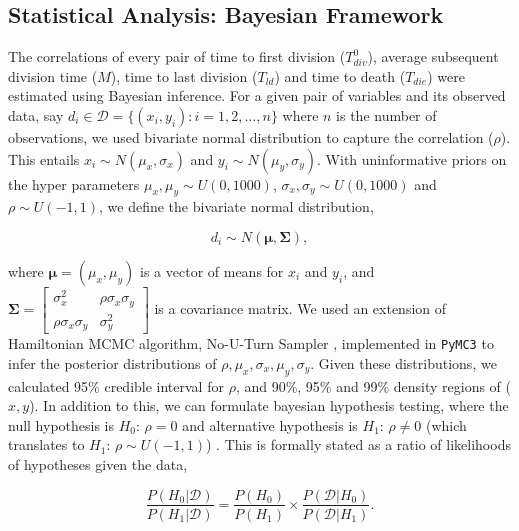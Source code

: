 \documentclass[11pt, a4paper]{article}
\begin{document}
\subsection{Statistical Analysis: Bayesian Framework}
The correlations of every pair of time to first division ($T_{div}^0$), average subsequent division time ($M$), time to last division ($T_{ld}$) and time to death ($T_{die}$) were estimated using Bayesian inference. For a given pair of variables and its observed data, say $d_i \in \mathcal{D} = \{(x_i, y_i) : i=1,2,\dots,n\}$ where $n$ is the number of observations, we used bivariate normal distribution to capture the correlation ($\rho$). This entails $x_i \sim N(\mu_x, \sigma_x)$ and $y_i \sim N(\mu_y, \sigma_y)$. With uninformative priors on the hyper parameters $\mu_x, \mu_y \sim U(0, 1000)$, $\sigma_x, \sigma_y \sim U(0, 1000)$ and $\rho \sim U(-1, 1)$, we define the bivariate normal distribution,
\begin{linenomath*}
    \begin{equation*}
        d_i \sim N(\boldsymbol{\mu}, \mathbf{\Sigma}),
    \end{equation*}
\end{linenomath*}
where $\boldsymbol{\mu} = (\mu_x, \mu_y)$ is a vector of means for $x_i$ and $y_i$, and $\mathbf{\Sigma} = \begin{bmatrix*} \sigma_x^2 & \rho \sigma_x \sigma_y \\ \rho \sigma_x \sigma_y & \sigma_y^2 \end{bmatrix*}$ is a covariance matrix. We used an extension of Hamiltonian MCMC algorithm, No-U-Turn Sampler \parencite{Hoffman.2011}, implemented in \verb+PyMC3+ \parencite{Salvatier.2016} to infer the posterior distributions of $\rho, \mu_x, \sigma_x, \mu_y, \sigma_y$. Given these distributions, we calculated 95\% credible interval for $\rho$, and 90\%, 95\% and 99\% density regions of ($x, y$). In addition to this, we can formulate bayesian hypothesis testing, where the null hypothesis is $H_0$: $\rho=0$ and alternative hypothesis is $H_1$: $\rho \neq 0$ (which translates to $H_1$: $\rho \sim U(-1, 1)$) \parencite{Jeffreys.1961}. This is formally stated as a ratio of likelihoods of hypotheses given the data,
\begin{linenomath*}
    \begin{equation*}
        \frac{P(H_0 | \mathcal{D})}{P(H_1 | \mathcal{D})} = \frac{P(H_0)}{P(H_1)} \times \frac{P(\mathcal{D} | H_0)}{P(\mathcal{D} | H_1)}.
    \end{equation*}
\end{linenomath*}
\end{document}
